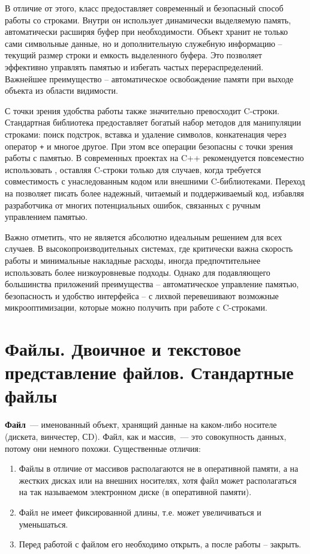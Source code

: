 В отличие от этого, класс  предоставляет современный и безопасный способ работы со строками. Внутри он использует динамически выделяемую память, 
автоматически расширяя буфер при необходимости. Объект  хранит не только сами символьные данные, но и дополнительную служебную информацию -- текущий 
размер строки и емкость выделенного буфера. Это позволяет эффективно управлять памятью и избегать частых перераспределений. Важнейшее преимущество  -- 
автоматическое освобождение памяти при выходе объекта из области видимости.

С точки зрения удобства работы  также значительно превосходит C-строки. Стандартная библиотека предоставляет богатый набор методов для манипуляции 
строками: поиск подстрок, вставка и удаление символов, конкатенация через оператор \verb|+| и многое другое. При этом все операции безопасны с точки зрения работы с памятью. 
В современных проектах на C++ рекомендуется повсеместно использовать , оставляя C-строки только для случаев, когда требуется совместимость с 
унаследованным кодом или внешними C-библиотеками. Переход на  позволяет писать более надежный, читаемый и поддерживаемый код, избавляя разработчика от 
многих потенциальных ошибок, связанных с ручным управлением памятью.

Важно отметить, что  не является абсолютно идеальным решением для всех случаев. В высокопроизводительных системах, где критически важна скорость работы и 
минимальные накладные расходы, иногда предпочтительнее использовать более низкоуровневые подходы. Однако для подавляющего большинства приложений преимущества 
-- автоматическое управление памятью, безопасность и удобство интерфейса -- с лихвой перевешивают возможные микрооптимизации, которые можно получить при работе с C-строками.


\section{Файлы. Двоичное и текстовое представление файлов. Стандартные файлы}
\textbf{Файл}~--- именованный объект, хранящий данные на каком-либо носителе (дискета, винчестер, СD). Файл, как и массив,~--- это совокупность данных, потому они немного похожи. Существенные отличия:
\begin{enumerate}
    \item Файлы в отличие от массивов располагаются не в оперативной памяти, а на жестких дисках или на внешних носителях, хотя файл может располагаться на так называемом электронном диске (в оперативной памяти).
    \item Файл не имеет фиксированной длины, т.е. может увеличиваться и уменьшаться.
    \item Перед работой с файлом его необходимо открыть, а после работы – закрыть\footnotemark.
\end{enumerate}

